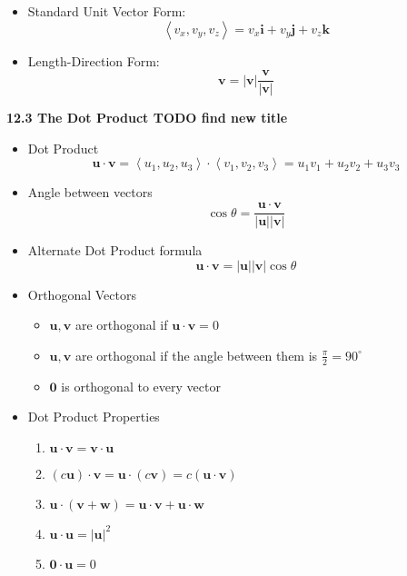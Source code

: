 \documentclass[12pt]{article}
\renewcommand{\vec}[1]{\mathbf{#1}}
\newcommand{\veci}{\mathbf{i}}
\newcommand{\vecj}{\mathbf{j}}
\newcommand{\veck}{\mathbf{k}}
\newcommand{\<}{\left<}
\renewcommand{\>}{\right>}
\begin{document}
\begin{itemize}
\begin{itemize}
\begin{itemize}
    \item Standard Unit Vector Form:
      \[\<v_x,v_y,v_z\> = v_x\veci + v_y\vecj + v_z\veck\]

    \item Length-Direction Form:
      \[\vec{v} = |\vec{v}|\frac{\vec{v}}{|\vec{v}|}\]

    \end{itemize}
  \end{itemize}
\end{itemize}

\newpage
  
\centerline{\bf 12.3 The Dot Product TODO find new title}
  
    \begin{itemize}
    \item Dot Product
      \[ \vec{u} \cdot \vec{v} = \<u_1,u_2,u_3\>\cdot\<v_1,v_2,v_3\> = u_1v_1 + u_2v_2 + u_3v_3 \]
  
    \item Angle between vectors
      \[\cos\theta = \frac{\vec{u}\cdot\vec{v}}{|\vec{u}||\vec{v}|}\] 
      
    \item Alternate Dot Product formula
      \[\vec{u} \cdot \vec{v} = |\vec{u}||\vec{v}|\cos \theta \]
      
    \item Orthogonal Vectors
      \begin{itemize}
      \item  $\vec{u},\vec{v}$ are orthogonal if $\vec{u} \cdot \vec{v} = 0$
      \item $\vec{u},\vec{v}$ are orthogonal if the angle between them is $\frac{\pi}{2} = 90^\circ$
      \item $\vec{0}$ is orthogonal to every vector
      \end{itemize}
    
    \item Dot Product Properties
      \begin{enumerate}
      \item $\vec{u} \cdot \vec{v} = \vec{v}\cdot\vec{u}$
      \item $(c\vec{u})\cdot \vec{v} = \vec{u} \cdot (c\vec{v}) = c(\vec{u} \cdot \vec{v})$
      \item $\vec{u} \cdot (\vec{v} + \vec{w}) = \vec{u}\cdot\vec{v} + \vec{u}\cdot \vec{w}$
      \item $\vec{u} \cdot \vec{u} = |\vec{u}|^2$
      \item $\vec{0} \cdot \vec{u} = 0$
      \end{enumerate}
    

\end{itemize}
\end{document}
